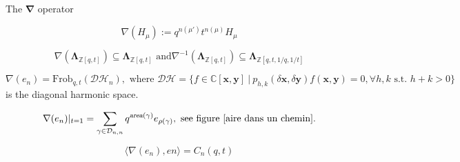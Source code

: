 \documentclass[12pt]{amsart}
\begin{document}
\begin{mdframed}[linecolor=red!20,linewidth=3pt,innertopmargin=8pt]
	\begin{minipage}[t]{8cm}
		\begin{bf}The $\bm{\nabla}$ operator\end{bf}
		\begin{equation}\nabla(H_\mu):=q^{n(\mu')}t^{n(\mu)} H_\mu
		\end{equation}
	\end{minipage}
	\begin{minipage}[t]{10.5cm}
		\begin{equation}\nabla(\mathbf{\Lambda}_{\mathbb{Z}[q,t]})\subseteq\mathbf{\Lambda}_{\mathbb{Z}[q,t]} \text{  and
} \nabla^{-1}(\mathbf{\Lambda}_{\mathbb{Z}[q,t]})\subseteq\mathbf{\Lambda}_{\mathbb{Z}[q,t,1/q,1/t]}
		\end{equation}
	\end{minipage}

	\begin{minipage}[t]{19cm}
		 \begin{equation} \nabla(e_n)=\textrm{Frob}_{q,t}(\mathcal{DH}_n),
\text{ where }\mathcal{DH}=\{f\in\mathbb{C}[\bm{x},\bm{y}]~|~p_{h,k}(\delta\bm{x},\delta\bm{y})f(\bm{x},\bm{y})=0, \forall h, k \text{ s.t. } h+k>0\} 
		  \end{equation}
		  is the diagonal harmonic space.
	\end{minipage}

	\begin{minipage}[t]{11.5cm}
		\begin{bf}\end{bf}
		 \begin{equation} \nabla(e_n)|_{t=1}=\sum_{\gamma \in \mathcal{D}_{n,n}} q^{\textsl{area}(\gamma)}e_{\rho(\gamma)}, 	\text{ see  figure \ref{aire dans un chemin}.}
 		\end{equation}	
	\end{minipage}
	\begin{minipage}[t]{7.5cm}
		\begin{bf}\end{bf}
		 \begin{equation}\langle \nabla(e_n),en\rangle=C_n(q,t)
		  \end{equation}
	\end{minipage}
\end{mdframed}
\end{document}
